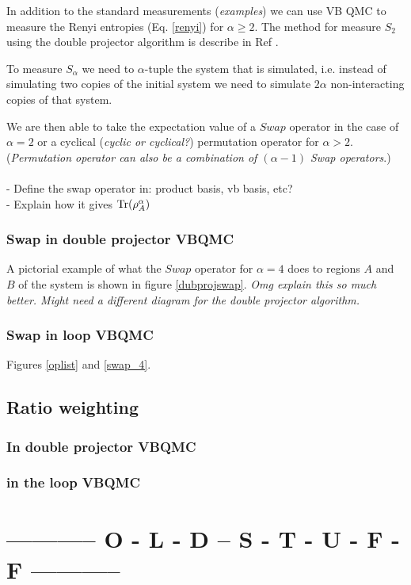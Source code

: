 \documentclass[prb,aps,twocolumn,floatfix,amsmath,amssymb,superscriptaddress,tightenlines]{revtex4}
\begin{document}
In addition to the standard measurements ({\it examples}) we can use VB QMC to measure the Renyi entropies (Eq. \eqref{renyi}) for $\alpha \ge 2$.  
The method for measure $S_2$ using the double projector algorithm is describe in Ref \cite{our paper}.

To measure $S_{\alpha}$ we need to $\alpha$-tuple the system that is simulated,
i.e. instead of simulating two copies of the initial system we need to simulate $2\alpha$ non-interacting copies of that system.

We are then able to take the expectation value of a $Swap$ operator in the case of $\alpha = 2$ or a cyclical ({\it cyclic or cyclical?}) permutation operator for $\alpha > 2$. 
({\it Permutation operator can also be a combination of $(\alpha - 1)$ Swap operators}.)
\\\\
- Define the swap operator in: product basis, vb basis, etc?\\
- Explain how it gives ${\rm Tr} (\rho_A^{\alpha})$

\subsubsection{Swap in double projector VBQMC}
A pictorial example of what the $Swap$ operator for $\alpha = 4$ does to regions $A$ and $B$ of the system is shown in figure \ref{dubprojswap}. {\it Omg explain this so much better.  Might need a different diagram for the double projector algorithm.}

\subsubsection{Swap in  loop VBQMC}
Figures \ref{oplist} and \ref{swap_4}.

\subsection{Ratio weighting}

\subsubsection{In double projector VBQMC}
\subsubsection{in the loop VBQMC}

\section{----------- O - L - D -- S - T - U - F - F -----------}
\end{document}
